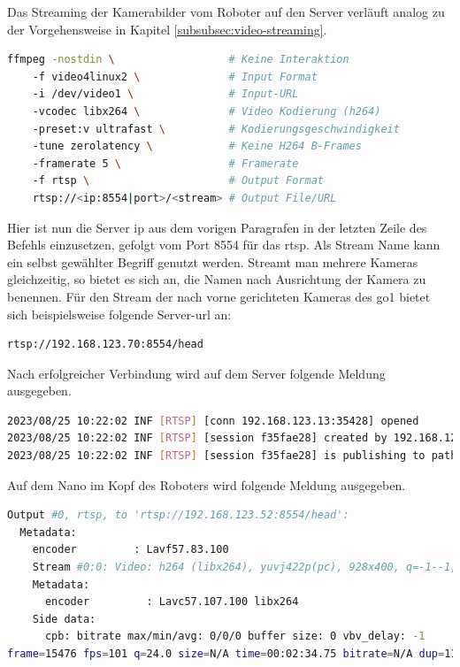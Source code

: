 
Das Streaming der Kamerabilder vom Roboter auf den Server verläuft analog zu der Vorgehensweise in Kapitel \ref{subsubsec:video-streaming}.

\begin{lstlisting}[language=Bash]
ffmpeg -nostdin \                  # Keine Interaktion
    -f video4linux2 \              # Input Format
    -i /dev/video1 \               # Input-URL
    -vcodec libx264 \              # Video Kodierung (h264)
    -preset:v ultrafast \          # Kodierungsgeschwindigkeit
    -tune zerolatency \            # Keine H264 B-Frames
    -framerate 5 \                 # Framerate
    -f rtsp \                      # Output Format
    rtsp://<ip:8554|port>/<stream> # Output File/URL
\end{lstlisting}

Hier ist nun die Server \gls{ip} aus dem vorigen Paragrafen in der letzten Zeile des Befehls einzusetzen, gefolgt vom Port
\num{8554} für das \gls{rtsp}.
Als Stream Name kann ein selbst gewählter Begriff genutzt werden.
Streamt man mehrere Kameras gleichzeitig, so bietet es sich an, die Namen nach Ausrichtung der Kamera zu benennen.
Für den Stream der nach vorne gerichteten Kameras des \gls{go1} bietet sich beispielsweise folgende Server-\gls{url} an:

\begin{lstlisting}[language=Bash]
rtsp://192.168.123.70:8554/head
\end{lstlisting}

\noindent Nach erfolgreicher Verbindung wird auf dem Server folgende Meldung ausgegeben.

\begin{lstlisting}[language=Bash]
2023/08/25 10:22:02 INF [RTSP] [conn 192.168.123.13:35428] opened
2023/08/25 10:22:02 INF [RTSP] [session f35fae28] created by 192.168.123.13:35428
2023/08/25 10:22:02 INF [RTSP] [session f35fae28] is publishing to path 'head', with TCP, 1 track (H264)
\end{lstlisting}

\noindent Auf dem Nano im Kopf des Roboters wird folgende Meldung ausgegeben.

\begin{lstlisting}[language=Bash]
Output #0, rtsp, to 'rtsp://192.168.123.52:8554/head':
  Metadata:
    encoder         : Lavf57.83.100
    Stream #0:0: Video: h264 (libx264), yuvj422p(pc), 928x400, q=-1--1, 100 fps, 90k tbn, 100 tbc
    Metadata:
      encoder         : Lavc57.107.100 libx264
    Side data:
      cpb: bitrate max/min/avg: 0/0/0 buffer size: 0 vbv_delay: -1
frame=15476 fps=101 q=24.0 size=N/A time=00:02:34.75 bitrate=N/A dup=11652 drop=0 speed=1.01x
\end{lstlisting}

